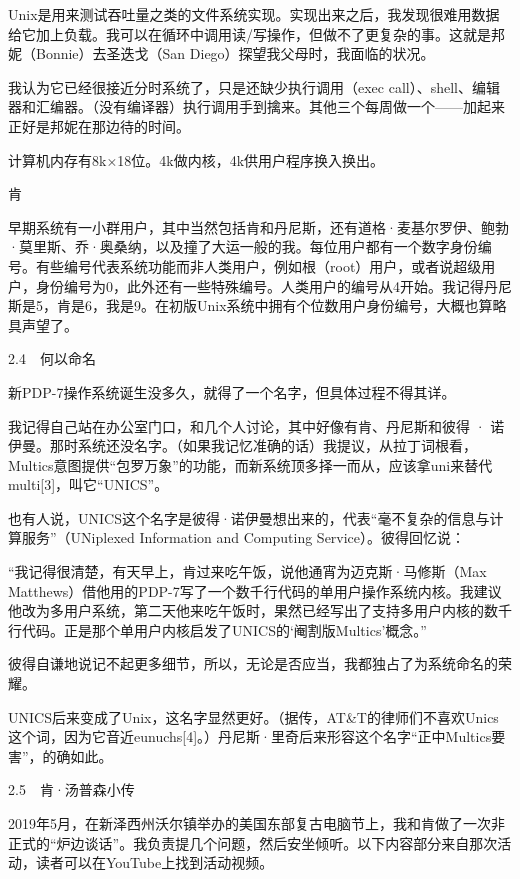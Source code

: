\documentclass[a4paper,12pt,UTF8,twoside]{ctexbook}
\begin{document}
{Unix是用来测试吞吐量之类的文件系统实现。实现出来之后，我发现很难用数据给它加上负载。我可以在循环中调用读/写操作，但做不了更复杂的事。这就是邦妮（Bonnie）去圣迭戈（San Diego）探望我父母时，我面临的状况。

我认为它已经很接近分时系统了，只是还缺少执行调用（exec call）、shell、编辑器和汇编器。（没有编译器）执行调用手到擒来。其他三个每周做一个——加起来正好是邦妮在那边待的时间。

计算机内存有8k×18位。4k做内核，4k供用户程序换入换出。

肯



早期系统有一小群用户，其中当然包括肯和丹尼斯，还有道格·麦基尔罗伊、鲍勃·莫里斯、乔·奥桑纳，以及撞了大运一般的我。每位用户都有一个数字身份编号。有些编号代表系统功能而非人类用户，例如根（root）用户，或者说超级用户，身份编号为0，此外还有一些特殊编号。人类用户的编号从4开始。我记得丹尼斯是5，肯是6，我是9。在初版Unix系统中拥有个位数用户身份编号，大概也算略具声望了。





2.4　何以命名


新PDP-7操作系统诞生没多久，就得了一个名字，但具体过程不得其详。

我记得自己站在办公室门口，和几个人讨论，其中好像有肯、丹尼斯和彼得 · 诺伊曼。那时系统还没名字。（如果我记忆准确的话）我提议，从拉丁词根看，Multics意图提供“包罗万象”的功能，而新系统顶多择一而从，应该拿uni来替代multi[3]，叫它“UNICS”。

也有人说，UNICS这个名字是彼得·诺伊曼想出来的，代表“毫不复杂的信息与计算服务”（UNiplexed Information and Computing Service）。彼得回忆说：

“我记得很清楚，有天早上，肯过来吃午饭，说他通宵为迈克斯·马修斯（Max Matthews）借他用的PDP-7写了一个数千行代码的单用户操作系统内核。我建议他改为多用户系统，第二天他来吃午饭时，果然已经写出了支持多用户内核的数千行代码。正是那个单用户内核启发了UNICS的‘阉割版Multics’概念。”



彼得自谦地说记不起更多细节，所以，无论是否应当，我都独占了为系统命名的荣耀。

UNICS后来变成了Unix，这名字显然更好。（据传，AT\&T的律师们不喜欢Unics这个词，因为它音近eunuchs[4]。）丹尼斯·里奇后来形容这个名字“正中Multics要害”，的确如此。





2.5　肯·汤普森小传


2019年5月，在新泽西州沃尔镇举办的美国东部复古电脑节上，我和肯做了一次非正式的“炉边谈话”。我负责提几个问题，然后安坐倾听。以下内容部分来自那次活动，读者可以在YouTube上找到活动视频。

}
\end{document}
